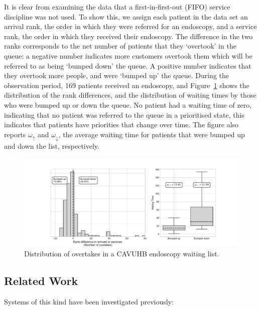 \documentclass{article}
\begin{document}
It is clear from examining the data that a first-in-first-out (FIFO) service
discipline was not used. To show this, we assign each patient in the data set
an arrival rank, the order in which they were referred for an endoscopy, and a
service rank, the order in which they received their endoscopy. The difference
in the two ranks corresponds to the net number of patients that they `overtook'
in the queue: a negative number indicates more customers overtook them which
will be referred to as being `bumped down' the queue.
A positive number indicates that they overtook more people, and were `bumped up'
the queue. During the observation period, 169 patients received an endoscopy,
and Figure~\ref{fig:motivating_overtakes} shows the distribution of the rank
differences, and the distribution of waiting times by those who were bumped up
or down the queue. No patient had a waiting time of zero, indicating that no
patient was referred to the queue in a prioritised state, this indicates that
patients have priorities that change over time.
The figure also reports $\omega_{\uparrow}$ and $\omega_{\downarrow}$, the
average waiting time for patients that were bumped up and down the list,
respectively.

\begin{figure}
  \begin{center}
    \includegraphics[width=\textwidth]{img/motivating_overtakes.pdf}
  \end{center}
  \caption{Distribution of overtakes in a CAVUHB endoscopy waiting list.}
  \label{fig:motivating_overtakes}
\end{figure}

\subsection{Related Work}\label{sec:related}
Systems of this kind have been investigated previously:
\end{document}
